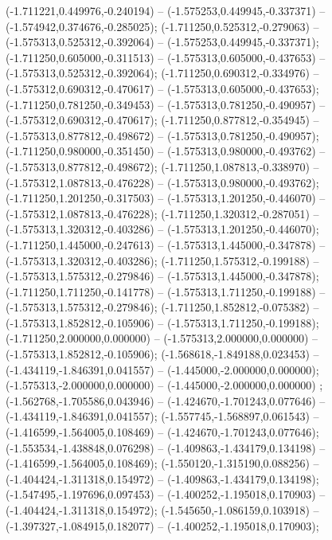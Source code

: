  (-1.711221,0.449976,-0.240194) -- (-1.575253,0.449945,-0.337371) -- (-1.574942,0.374676,-0.285025);
 (-1.711250,0.525312,-0.279063) -- (-1.575313,0.525312,-0.392064) -- (-1.575253,0.449945,-0.337371);
 (-1.711250,0.605000,-0.311513) -- (-1.575313,0.605000,-0.437653) -- (-1.575313,0.525312,-0.392064);
 (-1.711250,0.690312,-0.334976) -- (-1.575312,0.690312,-0.470617) -- (-1.575313,0.605000,-0.437653);
 (-1.711250,0.781250,-0.349453) -- (-1.575313,0.781250,-0.490957) -- (-1.575312,0.690312,-0.470617);
 (-1.711250,0.877812,-0.354945) -- (-1.575313,0.877812,-0.498672) -- (-1.575313,0.781250,-0.490957);
 (-1.711250,0.980000,-0.351450) -- (-1.575313,0.980000,-0.493762) -- (-1.575313,0.877812,-0.498672);
 (-1.711250,1.087813,-0.338970) -- (-1.575312,1.087813,-0.476228) -- (-1.575313,0.980000,-0.493762);
 (-1.711250,1.201250,-0.317503) -- (-1.575313,1.201250,-0.446070) -- (-1.575312,1.087813,-0.476228);
 (-1.711250,1.320312,-0.287051) -- (-1.575313,1.320312,-0.403286) -- (-1.575313,1.201250,-0.446070);
 (-1.711250,1.445000,-0.247613) -- (-1.575313,1.445000,-0.347878) -- (-1.575313,1.320312,-0.403286);
 (-1.711250,1.575312,-0.199188) -- (-1.575313,1.575312,-0.279846) -- (-1.575313,1.445000,-0.347878);
 (-1.711250,1.711250,-0.141778) -- (-1.575313,1.711250,-0.199188) -- (-1.575313,1.575312,-0.279846);
 (-1.711250,1.852812,-0.075382) -- (-1.575313,1.852812,-0.105906) -- (-1.575313,1.711250,-0.199188);
 (-1.711250,2.000000,0.000000) -- (-1.575313,2.000000,0.000000) -- (-1.575313,1.852812,-0.105906);
 (-1.568618,-1.849188,0.023453) -- (-1.434119,-1.846391,0.041557) -- (-1.445000,-2.000000,0.000000);
 (-1.575313,-2.000000,0.000000) -- (-1.445000,-2.000000,0.000000) ;
 (-1.562768,-1.705586,0.043946) -- (-1.424670,-1.701243,0.077646) -- (-1.434119,-1.846391,0.041557);
 (-1.557745,-1.568897,0.061543) -- (-1.416599,-1.564005,0.108469) -- (-1.424670,-1.701243,0.077646);
 (-1.553534,-1.438848,0.076298) -- (-1.409863,-1.434179,0.134198) -- (-1.416599,-1.564005,0.108469);
 (-1.550120,-1.315190,0.088256) -- (-1.404424,-1.311318,0.154972) -- (-1.409863,-1.434179,0.134198);
 (-1.547495,-1.197696,0.097453) -- (-1.400252,-1.195018,0.170903) -- (-1.404424,-1.311318,0.154972);
 (-1.545650,-1.086159,0.103918) -- (-1.397327,-1.084915,0.182077) -- (-1.400252,-1.195018,0.170903);
